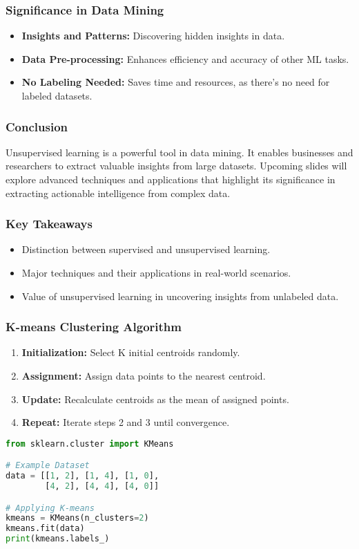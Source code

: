 \documentclass[aspectratio=169]{beamer}
\begin{document}
\begin{frame}[fragile]
    \frametitle{Significance in Data Mining}
    \begin{itemize}
        \item \textbf{Insights and Patterns:} Discovering hidden insights in data.
        \item \textbf{Data Pre-processing:} Enhances efficiency and accuracy of other ML tasks.
        \item \textbf{No Labeling Needed:} Saves time and resources, as there’s no need for labeled datasets.
    \end{itemize}
\end{frame}

\begin{frame}[fragile]
    \frametitle{Conclusion}
    Unsupervised learning is a powerful tool in data mining. It enables businesses and researchers to extract valuable insights from large datasets. Upcoming slides will explore advanced techniques and applications that highlight its significance in extracting actionable intelligence from complex data.
\end{frame}

\begin{frame}[fragile]
    \frametitle{Key Takeaways}
    \begin{itemize}
        \item Distinction between supervised and unsupervised learning.
        \item Major techniques and their applications in real-world scenarios.
        \item Value of unsupervised learning in uncovering insights from unlabeled data.
    \end{itemize}
\end{frame}

\begin{frame}[fragile]
    \frametitle{K-means Clustering Algorithm}
    \begin{enumerate}
        \item \textbf{Initialization:} Select K initial centroids randomly.
        \item \textbf{Assignment:} Assign data points to the nearest centroid.
        \item \textbf{Update:} Recalculate centroids as the mean of assigned points.
        \item \textbf{Repeat:} Iterate steps 2 and 3 until convergence.
    \end{enumerate}
    
    \begin{lstlisting}[language=Python]
from sklearn.cluster import KMeans

# Example Dataset
data = [[1, 2], [1, 4], [1, 0],
        [4, 2], [4, 4], [4, 0]]

# Applying K-means
kmeans = KMeans(n_clusters=2)
kmeans.fit(data)
print(kmeans.labels_)
    \end{lstlisting}
\end{frame}
\end{document}
